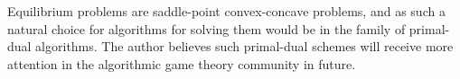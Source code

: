 \documentclass{article} %
\begin{document}
Equilibrium problems are saddle-point convex-concave problems, and as
such a natural choice for algorithms for solving them would be in the
family of primal-dual algorithms. The author believes such primal-dual
schemes will receive more attention in the algorithmic game theory
community in future.


\medskip \noindent

\small


\end{document}
